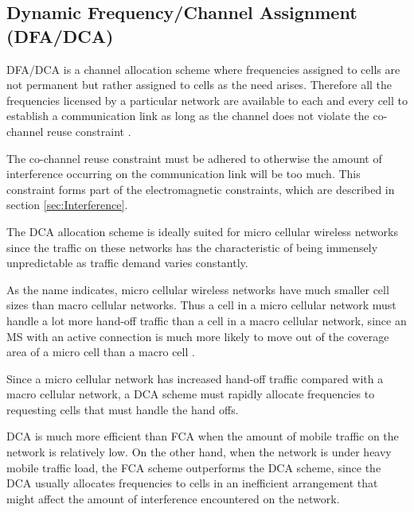 \subsection{Dynamic Frequency/Channel Assignment (DFA/DCA)}
DFA/DCA is a channel allocation scheme where frequencies assigned to cells are not permanent but rather assigned to cells as the need arises\cite{PrinciplesMobileCommunication}. Therefore all the frequencies licensed by a particular network are available to each and every cell to establish a communication link as long as the channel does not violate the co-channel reuse constraint \cite{PrinciplesMobileCommunication}. 

The co-channel reuse constraint must be adhered to otherwise the amount of interference occurring on the communication link will be too much. This constraint forms part of the electromagnetic constraints, which are described in section \ref{sec:Interference}.

The DCA allocation scheme is ideally suited for micro cellular wireless networks since the traffic on these networks has the characteristic of being immensely unpredictable as traffic demand varies constantly\cite{PrinciplesMobileCommunication,WirelessCommunications,MobileWirelessCommunications}.

As the name indicates, micro cellular wireless networks have much smaller cell sizes than macro cellular networks. Thus a cell in a micro cellular network must handle a lot more hand-off traffic than a cell in a macro cellular network, since an MS with an active connection is much more likely to move out of the coverage area of a micro cell than a macro cell \cite{PrinciplesMobileCommunication,WirelessCommunications,MobileWirelessCommunications}.

Since a micro cellular network has increased hand-off traffic compared with a macro cellular network, a DCA scheme must rapidly allocate frequencies to requesting cells that must handle the hand offs\cite{PrinciplesMobileCommunication,WirelessCommunications,MobileWirelessCommunications}.

DCA is much more efficient than FCA when the amount of mobile traffic on the network is relatively low. On the other hand, when the network is under heavy mobile traffic load, the FCA scheme outperforms the DCA scheme, since the DCA usually allocates frequencies to cells in an inefficient arrangement that might affect the amount of interference encountered on the network\cite{PrinciplesMobileCommunication,WirelessCommunications,MobileWirelessCommunications}.

